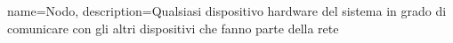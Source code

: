 {
	name={Nodo},
	description={Qualsiasi dispositivo hardware del sistema in grado di comunicare con gli altri dispositivi che fanno parte della rete}
}